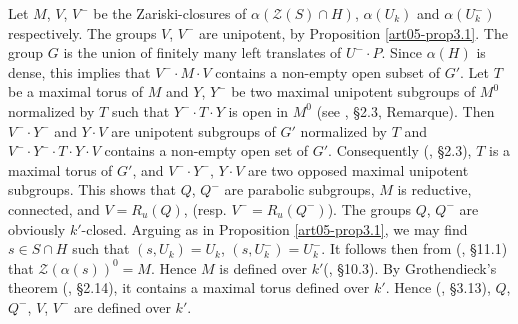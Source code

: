 Let $M$, $V$, $V^{-}$ be the Zariski-closures of $\alpha(\mathscr{Z}(S)\cap H)$, $\alpha(U_{k})$ and $\alpha(U^{-}_{k})$ respectively. The groups $V$, $V^{-}$ are unipotent, by Proposition \ref{art05-prop3.1}. The group $G$ is the union of finitely many left translates of $U^{-}\cdot P$. Since $\alpha(H)$ is dense, this implies that $V^{-}\cdot M\cdot V$ contains a non-empty open subset of $G'$. Let $T$ be a maximal torus of $M$ and $Y$, $Y^{-}$ be two maximal unipotent subgroups of $M^{0}$ normalized by $T$ such that $Y^{-}\cdot T\cdot Y$ is open in $M^{0}$ (see \cite{art05-key1}, \S2.3, Remarque). Then $V^{-}\cdot Y^{-}$ and $Y\cdot V$ are unipotent subgroups of $G'$ normalized by $T$ and $V^{-}\cdot Y^{-}\cdot T\cdot Y\cdot V$ contains a non-empty open set of $G'$. Consequently (\cite{art05-key1}, \S2.3), $T$ is a maximal torus of $G'$, and $V^{-}\cdot Y^{-}$, $Y\cdot V$ are two opposed maximal unipotent subgroups. This shows that $Q$, $Q^{-}$ are parabolic subgroups, $M$ is reductive, connected, and $V=R_{u}(Q)$, (resp. $V^{-}=R_{u}(Q^{-})$). The groups $Q$, $Q^{-}$ are obviously $k'$-closed. Arguing as in Proposition \ref{art05-prop3.1}, we may find $s\in S\cap H$ such that $(s,U_{k})=U_{k}$, $(s,U^{-}_{k})=U^{-}_{k}$. It follows then from (\cite{art05-key1}, \S11.1) that $\mathscr{Z}(\alpha(s))^{0}=M$. Hence $M$ is defined over $k'$(\cite{art05-key1}, \S10.3). By Grothendieck's theorem (\cite{art05-key1}, \S2.14), it contains a maximal torus defined over $k'$. Hence (\cite{art05-key1}, \S3.13), $Q$, $Q^{-}$, $V$, $V^{-}$ are defined over $k'$.

\setcounter{subsection}{2}
